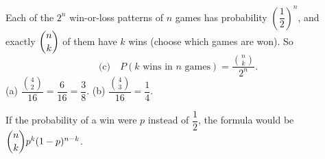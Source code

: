 Each of the $2^n$ win-or-loss patterns of $n$ games has probability $\left(\dfrac{1}{2}\right)^n$, and exactly $\dbinom nk$ of them have $k$ wins (choose which games are won). So
\[
\text{(c)}\quad P(k\text{ wins in }n\text{ games})=\boxed{\dfrac{\binom nk}{2^n}} .
\]
(a) $\dfrac{\binom42}{16}=\dfrac{6}{16}=\boxed{\dfrac{3}{8}}$. \quad (b) $\dfrac{\binom43}{16}=\boxed{\dfrac{1}{4}}$.

If the probability of a win were $p$ instead of $\dfrac{1}{2}$, the formula would be $\dbinom nkp^k(1-p)^{n-k}$.
